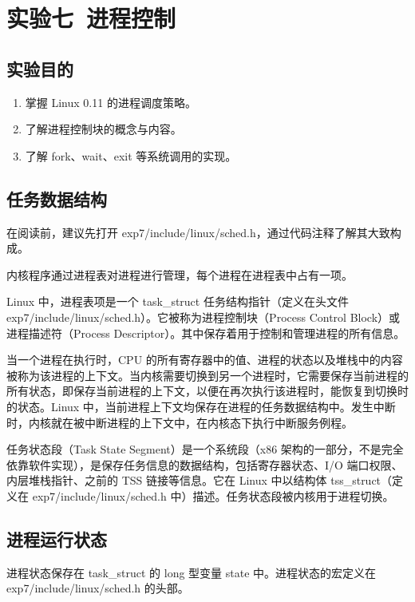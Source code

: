\section{实验七\ 进程控制}

\subsection{实验目的}

\begin{enumerate}
    \item 掌握 Linux 0.11 的进程调度策略。
    \item 了解进程控制块的概念与内容。
    \item 了解 fork、wait、exit 等系统调用的实现。
\end{enumerate}

\subsection{任务数据结构}

在阅读前，建议先打开 exp7/include/linux/sched.h，通过代码注释了解其大致构成。

内核程序通过进程表对进程进行管理，每个进程在进程表中占有一项。

Linux 中，进程表项是一个 task\_struct 任务结构指针（定义在头文件 exp7/include/linux/sched.h）。它被称为进程控制块（Process Control Block）或进程描述符（Process Descriptor）。其中保存着用于控制和管理进程的所有信息。

当一个进程在执行时，CPU 的所有寄存器中的值、进程的状态以及堆栈中的内容被称为该进程的上下文。当内核需要切换到另一个进程时，它需要保存当前进程的所有状态，即保存当前进程的上下文，以便在再次执行该进程时，能恢复到切换时的状态。Linux 中，当前进程上下文均保存在进程的任务数据结构中。发生中断时，内核就在被中断进程的上下文中，在内核态下执行中断服务例程。

任务状态段（Task State Segment）是一个系统段（x86 架构的一部分，不是完全依靠软件实现），是保存任务信息的数据结构，包括寄存器状态、I/O 端口权限、内层堆栈指针、之前的 TSS 链接等信息。它在 Linux 中以结构体 tss\_struct（定义在 exp7/include/linux/sched.h 中）描述。任务状态段被内核用于进程切换。

\subsection{进程运行状态}

进程状态保存在 task\_struct 的 long 型变量 state 中。进程状态的宏定义在 exp7/include/linux/sched.h 的头部。

